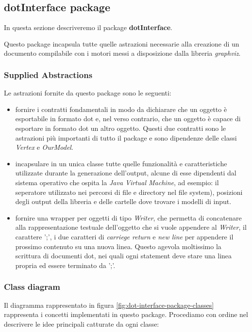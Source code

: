 \subsection{dotInterface package}

In questa sezione descriveremo il package \textbf{dotInterface}.

Questo package incapsula tutte quelle astrazioni necessarie alla
creazione di un documento compilabile con i motori messi a
disposizione dalla libreria \emph{graphviz}.

\subsubsection*{Supplied Abstractions}

Le astrazioni fornite da questo package sono le seguenti:
\begin{itemize}
\item fornire i contratti fondamentali in modo da dichiarare che un
  oggetto \`e esportabile in formato dot e, nel verso contrario, che
  un oggetto \`e capace di esportare in formato dot un altro
  oggetto. Questi due contratti sono le astrazioni pi\`u importanti di
  tutto il package e sono dipendenze delle classi \emph{Vertex} e
  \emph{OurModel}.
\item incapsulare in un unica classe tutte quelle funzionalit\`a e
  caratteristiche utilizzate durante la generazione dell'output,
  alcune di esse dipendenti dal sistema operativo che ospita la
  \emph{Java Virtual Machine}, ad esempio: il seperatore utilizzato
  nei percorsi di file e directory nel file system), posizioni degli
  output della libreria e delle cartelle dove trovare i modelli di
  input.
\item fornire una wrapper per oggetti di tipo \emph{Writer}, che
  permetta di concatenare alla rappresentazione testuale dell'oggetto
  che si vuole appendere al \emph{Writer}, il carattere ';', i due
  caratteri di \emph{carriege return} e \emph{new line} per appendere
  il prossimo contenuto su una nuova linea. Questo agevola moltissimo
  la scrittura di documenti dot, nei quali ogni statement deve stare
  una linea propria ed essere terminato da ';'.
\end{itemize}

\subsubsection*{Class diagram}
Il diagramma rappresentato in figura \ref{fig:dot-interface-package-classes}
rappresenta i concetti implementati in questo package. Procediamo con
ordine nel descrivere le idee principali catturate da ogni classe:

